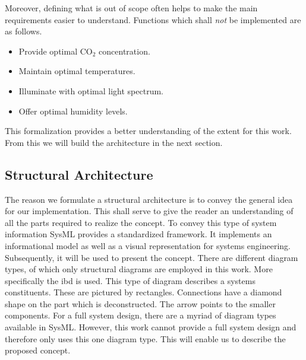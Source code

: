 Moreover, defining what is out of scope often helps to make the main requirements easier to understand.
Functions which shall \textit{not} be implemented are as follows.
\begin{itemize}
	\item Provide optimal CO$_2$ concentration.
	\item Maintain optimal temperatures.
	\item Illuminate with optimal light spectrum.
	\item Offer optimal humidity levels.
\end{itemize}

This formalization provides a better understanding of the extent for this work.
From this we will build the architecture in the next section.

\subsection{Structural Architecture}
\label{sub:stru-arch}
The reason we formulate a structural architecture is to convey the general idea for our implementation.
This shall serve to give the reader an understanding of all the parts required to realize the concept.
To convey this type of system information SysML provides a standardized framework.
It implements an informational model as well as a visual representation for systems engineering.
Subsequently, it will be used to present the concept.
There are different diagram types, of which only structural diagrams are employed in this work.
More specifically the \ac{ibd} is used.
This type of diagram describes a systems constituents.
These are pictured by rectangles.
Connections have a diamond shape on the part which is deconstructed.
The arrow points to the smaller components.
For a full system design, there are a myriad of diagram types available in SysML.
However, this work cannot provide a full system design and therefore only uses this one diagram type.
This will enable us to describe the proposed concept.

